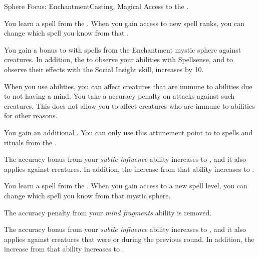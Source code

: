     \begin{feat}{Sphere Focus: Enchantment}{Casting, Magical}
        \featpre Access to the  .

         You learn a spell from the  .
        When you gain access to new spell ranks, you can change which spell you know from that .

         You gain a  bonus to  with spells from the Enchantment mystic sphere against \unaware creatures.
        In addition, the  to observe your  abilities with Spellsense, and to observe their effects with the Social Insight skill, increases by 10.

         When you use  abilities, you can affect creatures that are immune to  abilities due to not having a mind.
        You take a  accuracy penalty on attacks against such creatures.
        This does not allow you to affect creatures who are immune to  abilities for other reasons.

         You gain an additional .
        You can only use this attunement point to  to spells and rituals from the  .

         The accuracy bonus from your \textit{subtle influence} ability increases to , and it also applies against \partiallyunaware creatures.
        In addition, the  increase from that ability increases to .

         You learn a spell from the  .
        When you gain access to a new spell level, you can change which spell you know from that mystic sphere.

         The accuracy penalty from your \textit{mind fragments} ability is removed.

         The accuracy bonus from your \textit{subtle influence} ability increases to , and it also applies against creatures that were \unaware or \partiallyunaware during the previous round.
        In addition, the  increase from that ability increases to .
    \end{feat}

